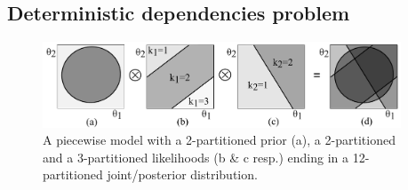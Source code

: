 
\subsection{Deterministic dependencies problem}
\label{sect:deterministic}
\begin{figure}
  \centering
  \includegraphics[width=0.95\textwidth]{pic/col21.pdf}
\caption{\footnotesize
A piecewise model with a 2-partitioned prior (a), 
a 2-partitioned and a 3-partitioned likelihoods (b \& c resp.) ending in a 12-partitioned joint/posterior distribution.
}
  \label{fig:simple.example}
\end{figure}


